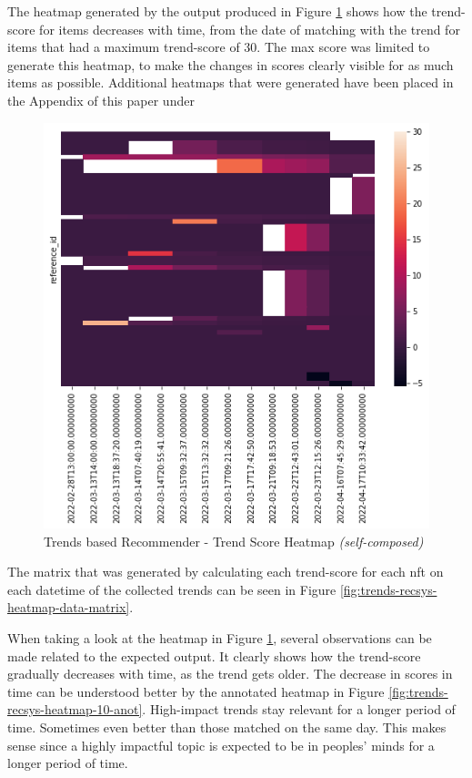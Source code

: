\documentclass[manuscript,natbib=false, anonymous]{acmart}
\begin{document}
The heatmap generated by the output produced in Figure \ref{fig:trends-recsys-heatmap30} shows how the trend-score for items decreases with time, from the date of matching with the trend for items that had a maximum trend-score of 30. The max score was limited to generate this heatmap, to make the changes in scores clearly visible for as much items as possible. Additional heatmaps that were generated have been placed in the Appendix of this paper under \textit{}

\begin{figure}[h]
\centering
\includegraphics[width=0.6\linewidth]{images/trends-heatmap-30.png}
\caption{Trends based Recommender - Trend Score Heatmap \textit{(self-composed)}}
\label{fig:trends-recsys-heatmap30}
\end{figure}

The matrix that was generated by calculating each trend-score for each \gls{nft} on each datetime of the collected trends can be seen in Figure \ref{fig:trends-recsys-heatmap-data-matrix}.

When taking a look at the heatmap in Figure \ref{fig:trends-recsys-heatmap30}, several observations can be made related to the expected output.
It clearly shows how the trend-score gradually decreases with time, as the trend gets older. The decrease in scores in time can be understood better by the annotated heatmap in Figure \ref{fig:trends-recsys-heatmap-10-anot}.
High-impact trends stay relevant for a longer period of time. Sometimes even better than those matched on the same day. This makes sense since a highly impactful topic is expected to be in peoples' minds for a longer period of time.
\end{document}
